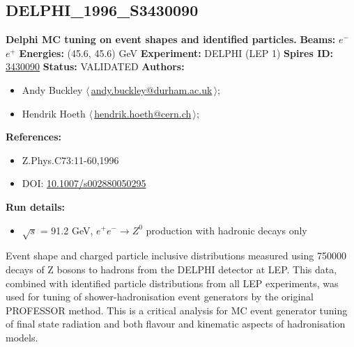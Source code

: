 \subsection[DELPHI\_1996\_S3430090]{DELPHI\_1996\_S3430090\,\cite{Abreu:1996na}}
\textbf{Delphi MC tuning on event shapes and identified particles.}\newline
\textbf{Beams:} $e^-$\,$e^+$ \newline
\textbf{Energies:} (45.6, 45.6) GeV \newline
\textbf{Experiment:} DELPHI (LEP 1) \newline
\textbf{Spires ID:} \href{http://www.slac.stanford.edu/spires/find/hep/www?rawcmd=key+3430090}{3430090}\newline
\textbf{Status:} VALIDATED\newline
\textbf{Authors:}
\begin{itemize}
  \item Andy Buckley $\langle\,$\href{mailto:andy.buckley@durham.ac.uk}{andy.buckley@durham.ac.uk}$\,\rangle$;
  \item Hendrik Hoeth $\langle\,$\href{mailto:hendrik.hoeth@cern.ch}{hendrik.hoeth@cern.ch}$\,\rangle$;
\end{itemize}
\textbf{References:}
\begin{itemize}
  \item Z.Phys.C73:11-60,1996
  \item DOI: \href{http://dx.doi.org/10.1007/s002880050295}{10.1007/s002880050295}
\end{itemize}
\textbf{Run details:}
\begin{itemize}

  \item \ensuremath{\sqrt{s}} = 91.2 GeV, $e^+ e^- \ensuremath{\to} Z^0$ production with hadronic decays only\end{itemize}

\noindent Event shape and charged particle inclusive distributions measured using 750000 decays of Z bosons to hadrons from the DELPHI detector at LEP. This data, combined with identified particle distributions from all LEP experiments, was used for tuning of shower-hadronisation event generators by the original PROFESSOR method.  This is a critical analysis for MC event generator tuning of final state radiation and both flavour and kinematic aspects of hadronisation models.

\clearpage


